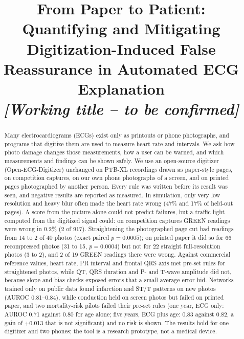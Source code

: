 \documentclass[conference]{IEEEtran}
\begin{document}
\title{From Paper to Patient: Quantifying and Mitigating Digitization-Induced False Reassurance in Automated ECG Explanation\\
\large \textit{[Working title -- to be confirmed]}}

\author{
}

\maketitle

\begin{abstract}
Many electrocardiograms (ECGs) exist only as printouts or phone photographs, and programs that digitize them are used to measure heart rate and intervals. We ask how photo damage changes those measurements, how a user can be warned, and which measurements and findings can be shown safely. We use an open-source digitizer (Open-ECG-Digitizer) unchanged on PTB-XL recordings drawn as paper-style pages, on competition captures, on our own phone photographs of a screen, and on printed pages photographed by another person. Every rule was written before its result was seen, and negative results are reported as measured. In simulation, only very low resolution and heavy blur often made the heart rate wrong (47\% and 17\% of held-out pages). A score from the picture alone could not predict failures, but a traffic light computed from the digitized signal could: on competition captures GREEN readings were wrong in 0.2\% (2 of 917). Straightening the photographed page cut bad readings from 14 to 2 of 40 photos (exact paired $p=0.0005$); on printed paper it did so for 66 recompressed photos (31 to 15, $p=0.0004$) but not for 22 straight full-resolution photos (3 to 2), and 2 of 19 GREEN readings there were wrong. Against commercial reference values, heart rate, PR interval and frontal QRS axis met pre-set rules for straightened photos, while QT, QRS duration and P- and T-wave amplitude did not, because slope and bias checks exposed errors that a small average error hid. Networks trained only on public data found infarction and ST/T patterns on new photos (AUROC 0.81--0.84), while conduction held on screen photos but failed on printed paper, and two mortality-risk pilots failed their pre-set rules (one year, ECG only: AUROC 0.71 against 0.80 for age alone; five years, ECG plus age: 0.83 against 0.82, a gain of +0.013 that is not significant) and no risk is shown. The results hold for one digitizer and two phones; the tool is a research prototype, not a medical device.
\end{abstract}
\end{document}
